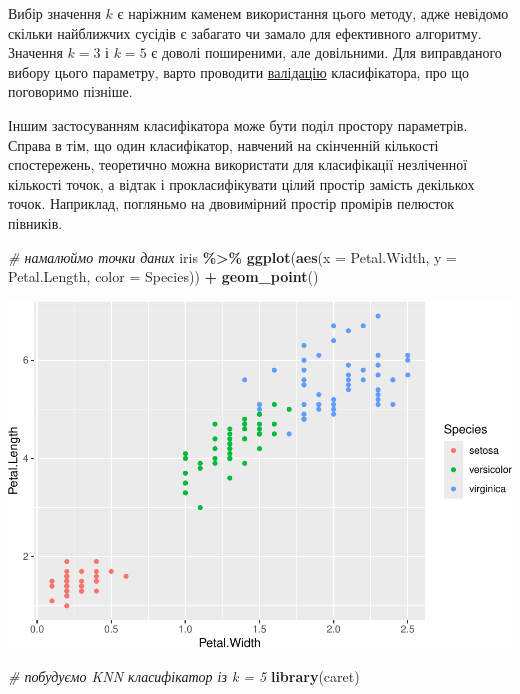 \documentclass[
  11pt,
]{book}
\newenvironment{Shaded}{\begin{snugshade}}{\end{snugshade}}
\newcommand{\AttributeTok}[1]{\textcolor[rgb]{0.13,0.29,0.53}{#1}}
\newcommand{\CommentTok}[1]{\textcolor[rgb]{0.56,0.35,0.01}{\textit{#1}}}
\newcommand{\FunctionTok}[1]{\textcolor[rgb]{0.13,0.29,0.53}{\textbf{#1}}}
\newcommand{\NormalTok}[1]{#1}
\newcommand{\SpecialCharTok}[1]{\textcolor[rgb]{0.81,0.36,0.00}{\textbf{#1}}}
\begin{document}
Вибір значення \(k\) є наріжним каменем використання цього методу, адже невідомо скільки найближчих сусідів є забагато чи замало для ефективного алгоритму. Значення \(k=3\) і \(k=5\) є доволі поширеними, але довільними. Для виправданого вибору цього параметру, варто проводити \hyperref[crossval]{валідацію} класифікатора, про що поговоримо пізніше.

Іншим застосуванням класифікатора може бути поділ простору параметрів. Справа в тім, що один класифікатор, навчений на скінченній кількості спостережень, теоретично можна використати для класифікації незліченної кількості точок, а відтак і прокласифікувати цілий простір замість декількох точок. Наприклад, погляньмо на двовимірний простір промірів пелюсток півників.

\begin{Shaded}
\begin{Highlighting}[]
\CommentTok{\# намалюймо точки даних}
\NormalTok{iris }\SpecialCharTok{\%\textgreater{}\%}
  \FunctionTok{ggplot}\NormalTok{(}\FunctionTok{aes}\NormalTok{(}\AttributeTok{x =}\NormalTok{ Petal.Width, }\AttributeTok{y =}\NormalTok{ Petal.Length, }\AttributeTok{color =}\NormalTok{ Species)) }\SpecialCharTok{+}
  \FunctionTok{geom\_point}\NormalTok{()}
\end{Highlighting}
\end{Shaded}

\includegraphics{bookdown-demo_files/figure-latex/unnamed-chunk-20-1.pdf}

\begin{Shaded}
\begin{Highlighting}[]
\CommentTok{\# побудуємо KNN класифікатор із k = 5}
\FunctionTok{library}\NormalTok{(caret)}
\end{Highlighting}
\end{Shaded}
\end{document}
